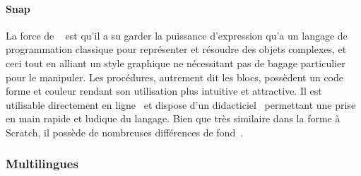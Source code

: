             \paragraph{Snap}\label{sec:Snap}
                La force de ~ est qu'il a su garder la puissance d'expression qu'a un langage de programmation classique pour représenter et résoudre des objets complexes, et ceci tout en alliant un style graphique ne nécessitant pas de bagage particulier pour le manipuler. Les procédures, autrement dit les blocs, possèdent un code forme et couleur rendant son utilisation plus intuitive et attractive. Il est utilisable directement en ligne~ et dispose d'un didacticiel~ permettant une prise en main rapide et ludique du langage. Bien que très similaire dans la forme à Scratch, il possède de nombreuses différences de fond~.
        \subsubsection{Multilingues}
